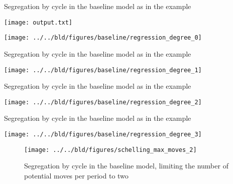 \documentclass[11pt, a4paper, leqno]{article}
\begin{document}
\begin{pdf}
    \caption{Segregation by cycle in the baseline \citet{Schelling69} model as in the \citet{StachurskiSargent13} example}
    \texttt{[image: output.txt]}

    \texttt{[image: ../../bld/figures/baseline/regression\_degree\_0]}

    \caption{Segregation by cycle in the baseline \citet{Schelling69} model as in the \citet{StachurskiSargent13} example}

    \texttt{[image: ../../bld/figures/baseline/regression\_degree\_1]}

    \caption{Segregation by cycle in the baseline \citet{Schelling69} model as in the \citet{StachurskiSargent13} example}

    \texttt{[image: ../../bld/figures/baseline/regression\_degree\_2]}

    \caption{Segregation by cycle in the baseline \citet{Schelling69} model as in the \citet{StachurskiSargent13} example}

    \texttt{[image: ../../bld/figures/baseline/regression\_degree\_3]}

\end{pdf}


\begin{figure}
    \caption{Segregation by cycle in the baseline \citet{Schelling69} model, limiting the number of potential moves per period to two}

    \texttt{[image: ../../bld/figures/schelling\_max\_moves\_2]}

\end{figure}





\printbibliography
{}





\end{document}
